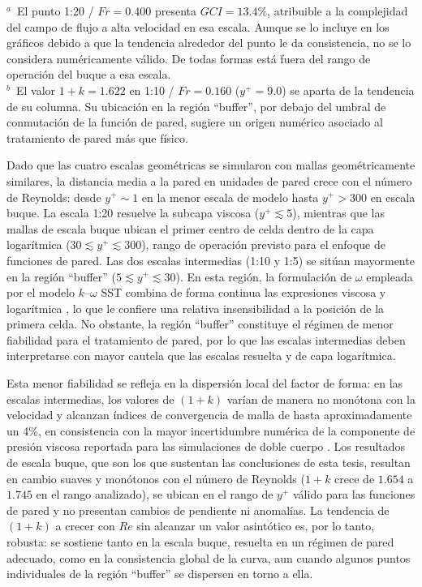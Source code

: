 \begin{table}[htbp]
\vspace{0.4em}
{\footnotesize\raggedright
$^{a}$~El punto 1:20 / $Fr = 0{.}400$ presenta $GCI = 13{.}4\%$, atribuible a
la complejidad del campo de flujo a alta velocidad en esa escala. Aunque se lo incluye en los gráficos debido a que la tendencia alrededor del punto le da consistencia, no se lo considera numéricamente válido. De todas formas está fuera del rango de operación del buque a esa escala.\\
$^{b}$~El valor $1+k = 1{.}622$ en 1:10 / $Fr = 0{.}160$ ($y^+ = 9{.}0$) se
aparta de la tendencia de su columna. Su ubicación en la región
``buffer'', por debajo del umbral de conmutación de la función de pared,
sugiere un origen numérico asociado al tratamiento de pared más que físico.\par}
\end{table}

Dado que las cuatro escalas geométricas se simularon con mallas
geométricamente similares, la distancia media a la pared en unidades de pared
crece con el número de Reynolds: desde $y^+ \sim 1$ en la menor escala de
modelo hasta $y^+ > 300$ en escala buque. La escala 1:20 resuelve la subcapa
viscosa ($y^+ \lesssim 5$), mientras que las mallas de escala buque ubican el
primer centro de celda dentro de la capa logarítmica
($30 \lesssim y^+ \lesssim 300$), rango de operación previsto para el enfoque
de funciones de pared. Las dos escalas intermedias (1:10 y 1:5) se sitúan
mayormente en la región ``buffer'' ($5 \lesssim y^+ \lesssim 30$). En
esta región, la formulación de $\omega$ empleada por el modelo $k$--$\omega$
SST combina de forma continua las expresiones viscosa y logarítmica
\citep{Menter1994}, lo que le confiere una relativa insensibilidad a la
posición de la primera celda. No obstante, la región ``buffer'' constituye el régimen de menor fiabilidad para el tratamiento de pared, por lo
que las escalas intermedias deben interpretarse con mayor cautela que las
escalas resuelta y de capa logarítmica.

Esta menor fiabilidad se refleja en la dispersión local del factor de forma:
en las escalas intermedias, los valores de $(1+k)$ varían de manera no
monótona con la velocidad y alcanzan índices de convergencia de malla de hasta
aproximadamente un 4\%, en consistencia con la mayor incertidumbre numérica de
la componente de presión viscosa reportada para las simulaciones de doble
cuerpo \citep{korkmaz_wetted_transom}. Los resultados de escala buque, que son los
que sustentan las conclusiones de esta tesis, resultan en cambio suaves y
monótonos con el número de Reynolds ($1+k$ crece de $1{.}654$ a $1{.}745$ en el
rango analizado), se ubican en el rango de $y^+$ válido para las funciones de
pared y no presentan cambios de pendiente ni anomalías. La tendencia de
$(1+k)$ a crecer con $Re$ sin alcanzar un valor asintótico es, por lo tanto,
robusta: se sostiene tanto en la escala buque, resuelta en un régimen de pared
adecuado, como en la consistencia global de la curva, aun cuando algunos
puntos individuales de la región ``buffer'' se dispersen en torno a ella.

